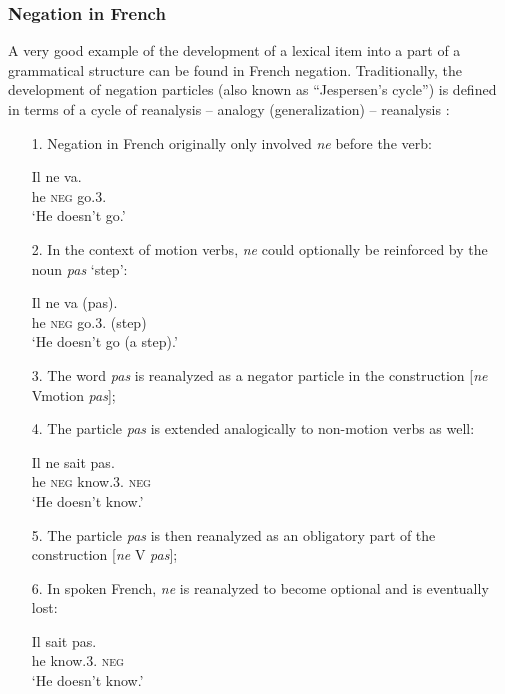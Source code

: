 \subsubsection{Negation in French} 
A very good example of the development of a lexical item into a part of a grammatical structure can be found in French negation. Traditionally, the development of negation particles (also known as ``Jespersen's cycle'') is defined in terms of a cycle of reanalysis -- analogy (generalization) -- reanalysis \cite[65--66]{hopper93grammaticalization}:

\begin{enumerate}  \item[1.]   Negation in French originally only involved {\em ne} before the verb:
 



\ea
\gll Il ne va.\\
he {\textsc{neg}} go.3{\sg}.{\prs}\\
\glt `He doesn't go.'\\
\z

  \item[2.]   In the context of motion verbs, {\em ne} could optionally be reinforced by the noun {\em pas} `step':
 


\ea
\gll Il ne va (pas).\\
he {\textsc{neg}} go.3{\sg}.{\prs} (step)\\
\glt `He doesn't go (a step).'\\
\z

 \item[3.]  The word {\em pas} is reanalyzed as a negator particle in the construction [{\em ne} Vmotion {\em pas}];
 

  \item[4.]   The particle {\em pas} is extended analogically to non-motion verbs as well:
 

 

\ea
\gll Il ne sait pas.\\
he {\textsc{neg}} know.3{\sg}.{\prs} {\textsc{neg}}\\
\glt `He doesn't know.'\\
\z


   \item[5.]  The particle {\em pas} is then reanalyzed as an obligatory part of the construction [{\em ne} V {\em pas}];
 

 \item[6.]  In spoken French, {\em ne} is reanalyzed to become optional and is eventually lost:

\ea
\gll Il sait pas.\\
he know.3{\sg}.{\prs} {\textsc{neg}}\\
\glt `He doesn't know.'\\
\z 

\end{enumerate}
 

